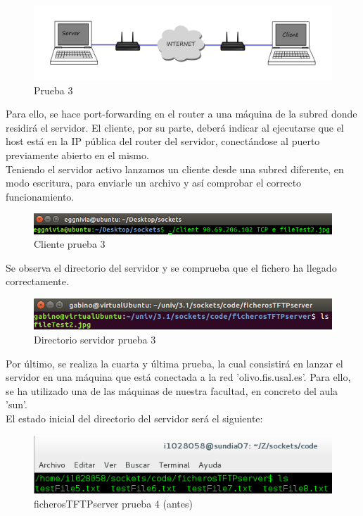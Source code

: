 \documentclass[journal, a4paper]{IEEEtran}
\begin{document}
\begin{figure}[H]
\centering
\includegraphics[scale=0.13]{images/cloud}
\caption{Prueba 3}
\end{figure}

Para ello, se hace port-forwarding en el router a una máquina de la subred donde residirá el servidor. El cliente, por su parte, deberá indicar al ejecutarse que el host está en la IP pública del router del servidor, conectándose al puerto previamente abierto en el mismo.\\

Teniendo el servidor activo lanzamos un cliente desde una subred diferente, en modo escritura, para enviarle un archivo y así comprobar el correcto funcionamiento.

\begin{figure}[H]
\centering
\includegraphics[scale=0.45]{images/client_after_3}
\caption{Cliente prueba 3}
\end{figure}

Se observa el directorio del servidor y se comprueba que el fichero ha llegado correctamente.

\begin{figure}[H]
\centering
\includegraphics[scale=0.55]{images/im1}
\caption{Directorio servidor prueba 3}
\end{figure}

Por último, se realiza la cuarta y última prueba, la cual consistirá en lanzar el servidor en una máquina que está conectada a la red 'olivo.fis.usal.es'. Para ello, se ha utilizado una de las máquinas de nuestra facultad, en concreto del aula 'sun'.\\

El estado inicial del directorio del servidor será el siguiente:

\begin{figure}[H]
\centering
\includegraphics[scale=0.45]{images/server_before_4}
\caption{ficherosTFTPserver prueba 4 (antes) }
\end{figure}
\end{document}
